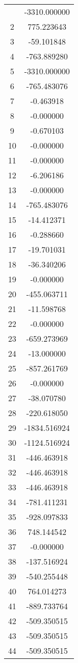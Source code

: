 \documentclass[12pt]{article}
\begin{document}
\begin{longtable}{@{}cc@{}}
\bottomrule
\endlastfoot
1 & -3310.000000 \\
2 & 775.223643 \\
3 & -59.101848 \\
4 & -763.889280 \\
5 & -3310.000000 \\
6 & -765.483076 \\
7 & -0.463918 \\
8 & -0.000000 \\
9 & -0.670103 \\
10 & -0.000000 \\
11 & -0.000000 \\
12 & -6.206186 \\
13 & -0.000000 \\
14 & -765.483076 \\
15 & -14.412371 \\
16 & -0.288660 \\
17 & -19.701031 \\
18 & -36.340206 \\
19 & -0.000000 \\
20 & -455.063711 \\
21 & -11.598768 \\
22 & -0.000000 \\
23 & -659.273969 \\
24 & -13.000000 \\
25 & -857.261769 \\
26 & -0.000000 \\
27 & -38.070780 \\
28 & -220.618050 \\
29 & -1834.516924 \\
30 & -1124.516924 \\
31 & -446.463918 \\
32 & -446.463918 \\
33 & -446.463918 \\
34 & -781.411231 \\
35 & -928.097833 \\
36 & 748.144542 \\
37 & -0.000000 \\
38 & -137.516924 \\
39 & -540.255448 \\
40 & 764.014273 \\
41 & -889.733764 \\
42 & -509.350515 \\
43 & -509.350515 \\
44 & -509.350515 \\

\end{longtable}
\end{document}
